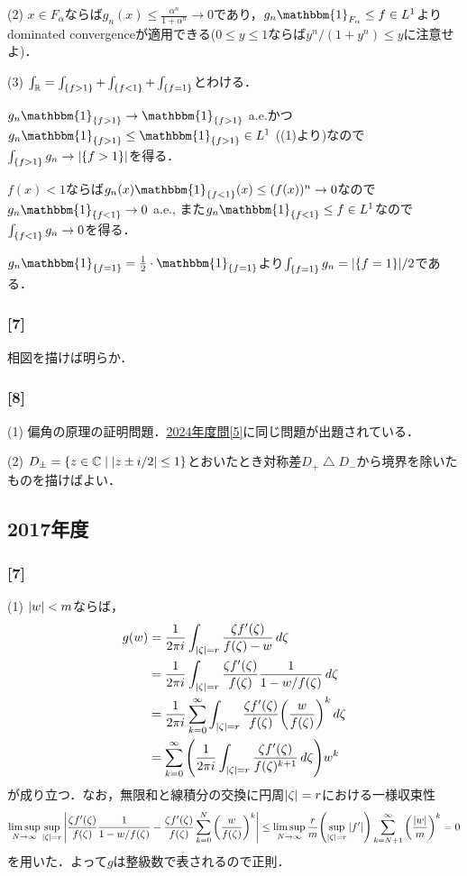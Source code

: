 \documentclass[a4j]{ltjsarticle}
\newcommand{\Rset}{\mathbb{R}}
\newcommand{\Cset}{\mathbb{C}}
\newcommand{\1}{\mathbbm{1}}
\numberwithin{equation}{section}
\theoremstyle{definition}
\begin{document}
(2) $x\in F_{\alpha}$ならば$g_n(x)\leq \frac{\alpha^n}{1+\alpha^n}\to 0$であり，$g_n\1_{F_{\alpha}}\leq f\in L^1$よりdominated convergenceが適用できる($0\leq y\leq 1$ならば$y^n/(1+y^n)\leq y$に注意せよ)．

(3) $\int_{\Rset}=\int_{\qty{f>1}}+\int_{\qty{f<1}}+\int_{\qty{f=1}}$とわける．

$g_n\1_{\qty{f>1}}\to \1_{\qty{f>1}}$ a.e.かつ$g_n\1_{\qty{f>1}}\leq \1_{\qty{f>1}}\in L^1$ ((1)より)なので$\int_{\qty{f>1}}g_n\to \abs{\qty{f>1}}$を得る．

$f(x)<1$ならば$g_n(x)\1_{\qty{f<1}}(x)\leq (f(x))^n\to0$なので$g_n\1_{\qty{f<1}}\to0$ a.e., また$g_n\1_{\qty{f<1}}\leq f\in L^1$なので$\int_{\qty{f<1}}g_n\to0$を得る．

$g_n\1_{\qty{f=1}}=\frac{1}{2}\cdot\1_{\qty{f=1}}$より$\int_{\qty{f=1}}g_n=\abs{\qty{f=1}}/2$である．

\subsubsection*{[7]}
相図を描けば明らか．

\subsubsection*{[8]}
(1) 偏角の原理の証明問題．\hyperref[pm_2024_5]{2024年度問[5]}に同じ問題が出題されている．

(2) $D_{\pm}=\qty{z\in\Cset\mid \abs{z\pm i/2}\leq 1}$とおいたとき対称差$D_{+}\bigtriangleup D_{-}$から境界を除いたものを描けばよい．
\subsection{2017年度}
\subsubsection*{[7]}
(1) $\abs{w}<m$ならば，
\begin{align}
    g(w)&=\frac{1}{2\pi i}\int_{\abs{\zeta}=r}\frac{\zeta f'(\zeta)}{f(\zeta)-w}\,d\zeta \\
    &=\frac{1}{2\pi i}\int_{\abs{\zeta}=r}\frac{\zeta f'(\zeta)}{f(\zeta)}\frac{1}{1-w/f(\zeta)}\,d\zeta\\
    &=\frac{1}{2\pi i}\sum_{k=0}^{\infty}\int_{\abs{\zeta}=r}\frac{\zeta f'(\zeta)}{f(\zeta)}\qty(\frac{w}{f(\zeta)})^k\,d\zeta \\
    &=\sum_{k=0}^{\infty}\qty(\frac{1}{2\pi i}\int_{\abs{\zeta}=r}\frac{\zeta f'(\zeta)}{f(\zeta)^{k+1}}\,d\zeta)w^{k}
\end{align}
が成り立つ．なお，無限和と線積分の交換に円周$\abs{\zeta}=r$における一様収束性
\begin{equation}
    \limsup_{N\to\infty}\sup_{\abs{\zeta}=r}\abs{\frac{\zeta f'(\zeta)}{f(\zeta)}\frac{1}{1-w/f(\zeta)}-\frac{\zeta f'(\zeta)}{f(\zeta)}\sum_{k=0}^N \qty(\frac{w}{f(\zeta)})^k}\leq \limsup_{N\to\infty} \frac{r}{m}\qty(\sup_{\abs{\zeta}=r}\abs{f'})\sum_{k=N+1}^\infty\qty(\frac{\abs{w}}{m})^k=0 
\end{equation}
を用いた．よって$g$は整級数で表されるので正則．
\end{document}
